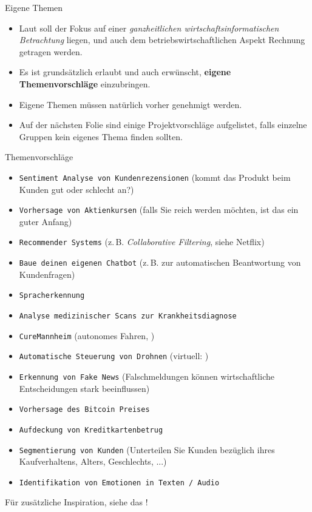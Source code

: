 \begin{dwHeaderFrame}{Eigene Themen}
	\begin{itemize}
		\item Laut \modulkatalog{} soll der Fokus auf einer \textit{\glqq{}ganzheitlichen wirtschaftsinformatischen Betrachtung\grqq{}} liegen,
			und auch dem betriebswirtschaftlichen Aspekt Rechnung getragen werden.
		\item Es ist grundsätzlich erlaubt und auch erwünscht, \textbf{eigene Themenvorschläge} einzubringen.
		\item Eigene Themen müssen natürlich vorher genehmigt werden.
		\item Auf der nächsten Folie sind einige Projektvorschläge aufgelistet, falls einzelne Gruppen kein eigenes Thema finden sollten.
	\end{itemize}
\end{dwHeaderFrame}

\begin{dwHeaderFrame}{Themenvorschläge}
	\begin{itemize} 
		\item \texttt{Sentiment Analyse von Kundenrezensionen} (kommt das Produkt beim Kunden gut oder schlecht an?)
		\item \texttt{Vorhersage von Aktienkursen} (falls Sie reich werden möchten, ist das ein guter Anfang)
		\item \texttt{Recommender Systems} (z.\,B. \textit{Collaborative Filtering}, siehe Netflix)
		\item \texttt{Baue deinen eigenen Chatbot} (z.\,B. zur automatischen Beantwortung von Kundenfragen)
		\item \texttt{Spracherkennung}
		\item \texttt{Analyse medizinischer Scans zur Krankheitsdiagnose}
		\item \texttt{CureMannheim} (autonomes Fahren, \curemannheim)
		\item \texttt{Automatische Steuerung von Drohnen} (virtuell: \airsim)
		\item \texttt{Erkennung von \glqq{}Fake News\grqq{}} (Falschmeldungen können wirtschaftliche Entscheidungen stark beeinflussen)
		\item \texttt{Vorhersage des Bitcoin Preises}
	\end{itemize}
\end{dwHeaderFrame}


\begin{frame}
	\begin{itemize}
		\item \texttt{Aufdeckung von Kreditkartenbetrug}
		\item \texttt{Segmentierung von Kunden} (Unterteilen Sie Kunden bezüglich ihres Kaufverhaltens, Alters, Geschlechts, ...)
		\item \texttt{Identifikation von Emotionen in Texten / Audio}
	\end{itemize}
	
	\vspace*{4mm}
	Für zusätzliche Inspiration, siehe das \uci!
\end{frame}


\makethanks


